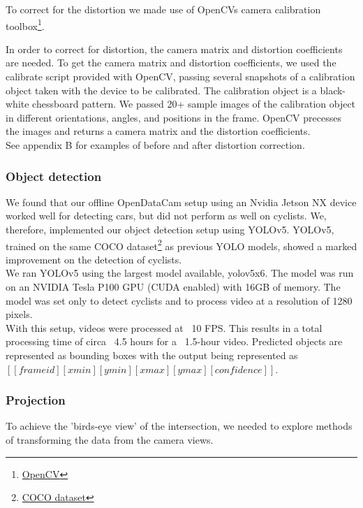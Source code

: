 To correct for the distortion we made use of OpenCVs camera calibration toolbox\footnote{\href{https://github.com/opencv/opencv}{OpenCV}}.

In order to correct for distortion, the camera matrix and distortion coefficients are needed. To get the camera matrix and distortion coefficients, we used the calibrate script provided with OpenCV,
passing several snapshots of a calibration object taken with the device to be calibrated. The calibration object is a black-white chessboard pattern.
We passed 20+ sample images of the calibration object in different orientations, angles, and positions in the frame. 
OpenCV precesses the images and returns a camera matrix and the distortion coefficients.
\ \\

See appendix B for examples of before and after distortion correction.

\subsubsection{Object detection}
We found that our offline OpenDataCam setup using an Nvidia Jetson NX device worked well for detecting cars, 
but did not perform as well on cyclists. 
We, therefore, implemented our object detection setup using YOLOv5. YOLOv5, trained on the same COCO dataset\footnote{\href{https://cocodataset.org}{COCO dataset}}
as previous YOLO models, showed a marked improvement on the detection of
cyclists.
\ \\ 

We ran  YOLOv5 using the largest model available, yolov5x6.
The model was run on an NVIDIA Tesla P100 GPU (CUDA enabled) with 16GB of memory. The model was set only to detect cyclists and to process
video at a resolution of 1280 pixels.
\ \\
 
With this setup, videos were processed at ~10 FPS. This results in a total processing time of circa ~4.5 hours for a ~1.5-hour video.
Predicted objects are represented as bounding boxes with the output being represented as $[[frame id][xmin][ymin][xmax][ymax][confidence]]$.

\subsubsection{Projection}
To achieve the 'birds-eye view' of the intersection, we needed to explore methods of 
transforming the data from the camera views.  
\ \\

